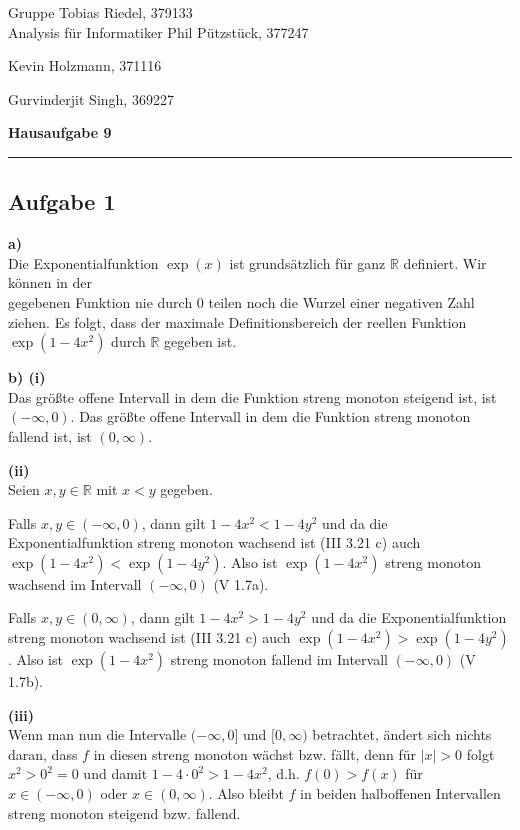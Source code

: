 \documentclass[a4paper,graphics,11pt]{article}
\newcommand{\aufgabe}[1]{\subsection*{Aufgabe #1}}
\begin{document}
\noindent Gruppe              \hfill Tobias Riedel, 379133 \\
\noindent Analysis für Informatiker             \hfill Phil Pützstück, 377247 \\
\strut\hfill Kevin Holzmann, 371116\\
\strut\hfill Gurvinderjit Singh, 369227
\begin{center}
	\LARGE{\textbf{Hausaufgabe 9}}
\end{center}
\begin{center}
\rule[0.1ex]{\textwidth}{1pt}
\end{center}



\aufgabe{1}
\textbf{a)}\\
Die Exponentialfunktion $\exp(x)$ ist grundsätzlich für ganz $\mathbb{R}$ definiert.
Wir können in der\\
gegebenen Funktion nie durch 0 teilen noch die Wurzel einer
negativen Zahl ziehen. Es folgt, dass der maximale Definitionsbereich der
reellen Funktion $\exp(1-4x^2)$ durch $\mathbb{R}$ gegeben ist.

\textbf{b) (i)}\\
Das größte offene Intervall in dem die Funktion streng monoton steigend ist, ist
$(-\infty, 0)$. Das größte offene Intervall in dem die Funktion streng monoton
fallend ist, ist $(0, \infty)$.

\textbf{(ii)}\\
Seien $x,y \in \mathbb{R}$ mit $x<y$ gegeben.

Falls $x,y \in (-\infty, 0)$, dann gilt $1-4x^2 < 1-4y^2$ und da die Exponentialfunktion
streng monoton wachsend ist (III 3.21 c) auch $\exp(1-4x^2) < \exp(1-4y^2)$.
Also ist $\exp(1-4x^2)$ streng monoton wachsend im Intervall $(-\infty, 0)$ (V 1.7a).

Falls $x,y \in (0, \infty)$, dann gilt $1-4x^2 > 1-4y^2$ und da die Exponentialfunktion
streng monoton wachsend ist (III 3.21 c) auch $\exp(1-4x^2) > \exp(1-4y^2)$.
Also ist $\exp(1-4x^2)$ streng monoton fallend im Intervall $(-\infty, 0)$ (V 1.7b).

\textbf{(iii)}\\
Wenn man nun die Intervalle $(-\infty, 0]$ und $[0, \infty)$ betrachtet, ändert sich
nichts daran, dass $f$ in diesen streng monoton wächst bzw. fällt, denn für
$|x| > 0$ folgt $x^2 > 0^2 = 0$ und damit $1-4\cdot0^2 > 1-4x^2$, d.h.
$f(0) > f(x)$ für $x \in (-\infty, 0)$ oder $x \in (0, \infty)$. Also
bleibt $f$ in beiden halboffenen Intervallen streng monoton steigend bzw. fallend.
\end{document}

